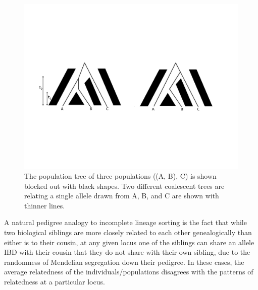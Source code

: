 \begin{figure}
\begin{center}
\includegraphics[width=\textwidth]{figures/Genetic_drift/ILS/ILS_coal_cartoon.pdf}
\end{center}
\caption{The population tree of three populations ((A, B), C) is shown
blocked out with black shapes. Two different coalescent trees are
relating a single allele drawn from A, B, and C are shown with thinner lines.} \label{fig:ILS_cartoon} 
\end{figure}

A natural pedigree analogy to incomplete lineage sorting is the fact that while two
biological siblings are more closely related to each other genealogically than
either is to their cousin, at any given locus one of the siblings can
share an allele IBD with their cousin that they do not share with
their own sibling, due to the randomness of Mendelian segregation down their
pedigree. In these cases, the average relatedness of the individuals/populations disagrees
with the patterns of relatedness at a particular locus. 



